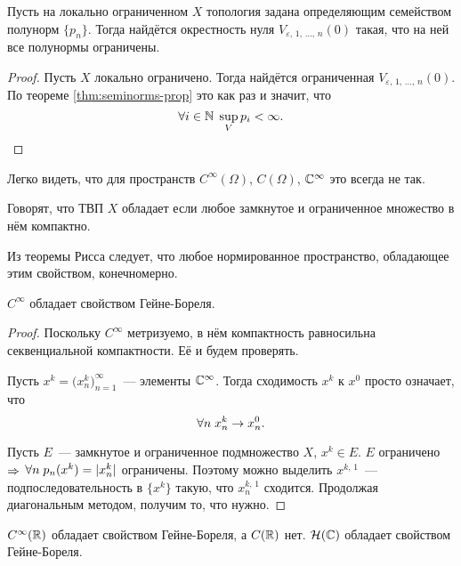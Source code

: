 \documentclass{notes}
\begin{document}
	\begin{st}
		Пусть на локально ограниченном $X$ топология задана определяющим семейством полунорм $\{p_n\}$. Тогда найдётся окрестность нуля $V_{\varepsilon, \, 1, \, \ldots, \, n}(0)$ такая, что на ней все полунормы ограничены.
		\begin{proof}
			Пусть $X$ локально ограничено. Тогда найдётся ограниченная $V_{\varepsilon, \, 1, \, \ldots, \, n}(0)$. По теореме \ref{thm:seminorms-prop} это как раз и значит, что
			\[
				\forall i \in \mathbb{N} \; \sup\limits_{V} p_i < \infty.
			\]
		\end{proof}
	\end{st}

	\begin{exm}
		Легко видеть, что для пространств $C^{\infty}(\Omega)$, $C(\Omega)$, $\mathbb{C}^{\infty}$ это всегда не так.
	\end{exm}

	\begin{de}
		Говорят, что ТВП $X$ обладает  если любое замкнутое и ограниченное множество в нём компактно. 
	\end{de}

	\begin{rem}
		Из теоремы Рисса следует, что любое нормированное пространство, обладающее этим свойством, конечномерно.
	\end{rem}

	\begin{st}
		$C^{\infty}$ обладает свойством Гейне-Бореля.
		\begin{proof}	
			Поскольку $C^{\infty}$ метризуемо, в нём компактность равносильна секвенциальной компактности. Её и будем проверять.

			Пусть $x^k = \big(x_n^k\big)_{n = 1}^{\infty}$~--- элементы $\mathbb{C}^{\infty}$. Тогда сходимость $x^k$ к $x^0$ просто означает, что
			\[
				\forall n \; x_n^k \to x_n^0.
			\]

			Пусть $E$~--- замкнутое и ограниченное подмножество $X$, $x^k \in E$. $E$ ограничено $\Rightarrow$ $\forall n \; p_n(x^k) = |x_n^k|$ ограничены. Поэтому можно выделить $x^{k, \, 1}$~--- подпоследовательность в $\{x^k\}$ такую, что $x^{k, \, 1}_n$ сходится. Продолжая диагональным методом, получим то, что нужно.
		\end{proof}
	\end{st}

	\begin{rem}
		$C^{\infty}(\mathbb{R})$ обладает свойством Гейне-Бореля, а $C(\mathbb{R})$ нет. $\mathcal{H}(\mathbb{C})$ обладает свойством Гейне-Бореля.
	\end{rem}
\end{document}
